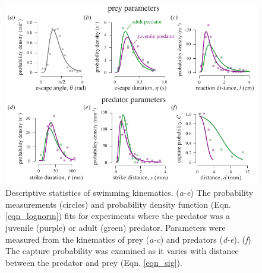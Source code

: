 \documentclass[]{rsos}%
\begin{document}
\begin{figure}[!h]
\centering
	\includegraphics[width=5.5in]{fig_PDFs}
\caption{
Descriptive statistics of swimming kinematics. 
(\textit{a-e}) The probability measurements (circles) and probability density function (Eqn. \ref{eqn_lognorm}) fits for experiments where the predator was a juvenile (purple) or adult (green) predator.
Parameters were measured from the kinematics of prey (\textit{a-c}) and predators (\textit{d-e}).
(\textit{f}) The capture probability was examined as it varies with distance between the predator and prey (Eqn. \ref{eqn_sig}).  
}
\label{fig_PDF}
\end{figure}

\pagebreak
\end{document}
